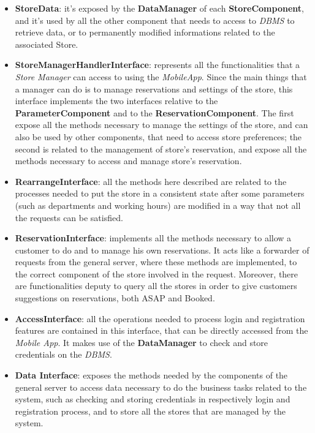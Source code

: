 \documentclass{article}
\begin{document}
	\begin{itemize}
		\item {\bfseries StoreData}: it's exposed by the {\bfseries DataManager} of each {\bfseries StoreComponent}, and it's used by all the other component that needs to access to \emph{DBMS} to retrieve data, or to permanently modified informations related to the associated Store.
		\item {\bfseries StoreManagerHandlerInterface}: represents all the functionalities that a \emph{Store Manager} can access to using the \emph{MobileApp}. Since the main things that a manager can do is to manage reservations and settings of the store, this interface implements the two interfaces relative to the {\bfseries ParameterComponent} and to the {\bfseries ReservationComponent}. The first expose all the methods necessary to manage the settings of the store, and can also be used by other components, that need to access store preferences; the second is related to the management of store's reservation, and expose all the methods necessary to access and manage store's reservation.
		\item{\bfseries RearrangeInterface}: all the methods here described are related to the processes needed to put the store in a consistent state after some parameters (such as departments and working hours) are modified in a way that not all the requests can be satisfied.
		\item{\bfseries ReservationInterface}: implements all the methods necessary to allow a customer to do and to manage his own reservations. It acts like a forwarder of requests from the general server, where these methods are implemented, to the correct component of the store involved in the request. Moreover, there are functionalities deputy to query all the stores in order to give customers suggestions on reservations, both ASAP and Booked.
		\item{\bfseries AccessInterface}: all the operations needed to process login and registration features are contained in this interface, that can be directly accessed from the \emph{Mobile App}. It makes use of the {\bfseries DataManager} to check and store credentials on the \emph{DBMS}.
		\item{\bfseries Data Interface}: exposes the methods needed by the components of the general server to access data necessary to do the business tasks related to the system, such as checking and storing credentials in respectively login and registration process, and to store all the stores that are managed by the system.

\end{itemize}
\end{document}
